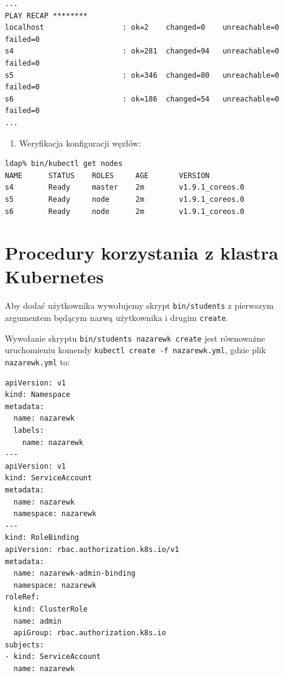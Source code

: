 \documentclass[a4paper,12pt,twoside,openany]{report}
\providecommand{\tightlist}{%
  \setlength{\itemsep}{0pt}\setlength{\parskip}{0pt}}
\newcommand{\passthrough}[1]{#1}
\begin{document}
\begin{lstlisting}
...
PLAY RECAP ********
localhost                  : ok=2    changed=0    unreachable=0    failed=0   
s4                         : ok=281  changed=94   unreachable=0    failed=0   
s5                         : ok=346  changed=80   unreachable=0    failed=0   
s6                         : ok=186  changed=54   unreachable=0    failed=0   
...
\end{lstlisting}

\begin{enumerate}
\def\labelenumi{\arabic{enumi}.}
\setcounter{enumi}{8}
\tightlist
\item
  Weryfikacja konfiguracji węzłów:
\end{enumerate}

\begin{lstlisting}[language=bash]
ldap% bin/kubectl get nodes
NAME      STATUS    ROLES     AGE       VERSION
s4        Ready     master    2m        v1.9.1_coreos.0
s5        Ready     node      2m        v1.9.1_coreos.0
s6        Ready     node      2m        v1.9.1_coreos.0
\end{lstlisting}

\hypertarget{procedury-korzystania-z-klastra-kubernetes}{%
\section{Procedury korzystania z klastra
Kubernetes}\label{procedury-korzystania-z-klastra-kubernetes}}

Aby dodać użytkownika wywołujemy skrypt
\passthrough{\lstinline!bin/students!} z pierwszym argumentem będącym
nazwą użytkownika i drugim \passthrough{\lstinline!create!}.

Wywołanie skryptu \passthrough{\lstinline!bin/students nazarewk create!}
jest równoważne uruchomieniu komendy
\passthrough{\lstinline!kubectl create -f nazarewk.yml!}, gdzie plik
\passthrough{\lstinline!nazarewk.yml!} to:

\begin{lstlisting}
apiVersion: v1
kind: Namespace
metadata:
  name: nazarewk
  labels:
    name: nazarewk
---
apiVersion: v1
kind: ServiceAccount
metadata:
  name: nazarewk
  namespace: nazarewk
---
kind: RoleBinding
apiVersion: rbac.authorization.k8s.io/v1
metadata:
  name: nazarewk-admin-binding
  namespace: nazarewk
roleRef:
  kind: ClusterRole
  name: admin
  apiGroup: rbac.authorization.k8s.io
subjects:
- kind: ServiceAccount
  name: nazarewk
\end{lstlisting}
\end{document}

